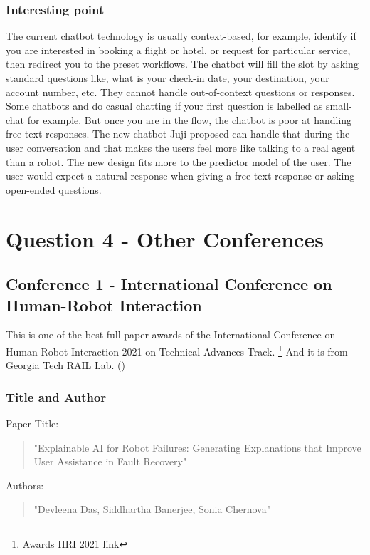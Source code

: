 \documentclass[
	letterpaper, %
]{jdf}
\begin{document}
\subsubsection{Interesting point}
The current chatbot technology is usually context-based, for example, identify if you are interested in booking a flight or hotel, or request for particular service, then redirect you to the preset workflows. The chatbot will fill the slot by asking standard questions like, what is your check-in date, your destination, your account number, etc. They cannot handle out-of-context questions or responses. Some chatbots and do casual chatting if your first question is labelled as small-chat for example. But once you are in the flow, the chatbot is poor at handling free-text responses. The new chatbot Juji proposed can handle that during the user conversation and that makes the users feel more like talking to a real agent than a robot. The new design fits more to the predictor model of the user. The user would expect a natural response when giving a free-text response or asking open-ended questions.

\section{Question 4 - Other Conferences}

\subsection{Conference 1 - International Conference on Human-Robot Interaction}
This is one of the best full paper awards of the International Conference on Human-Robot Interaction 2021 on Technical Advances Track. \footnote{Awards HRI 2021 \href{https://humanrobotinteraction.org/2021/awards/}{link}} And it is from Georgia Tech RAIL Lab.
(\cite{10.1145/3434073.3444657})
\subsubsection{Title and Author}
Paper Title:
\begin{quotation}
\noindent "Explainable AI for Robot Failures: Generating Explanations that Improve User Assistance in Fault Recovery" 
\end{quotation}

Authors:
\begin{quotation}
\noindent "Devleena Das, Siddhartha Banerjee, Sonia Chernova"
\end{quotation}
\end{document}
